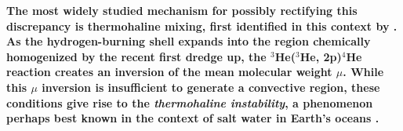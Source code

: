 



\textbf{The most widely studied mechanism for possibly rectifying this discrepancy is thermohaline mixing, first identified in this context by \citet{charbonnel_thermohaline_2007}.
As the hydrogen-burning shell expands into the region chemically homogenized by the recent first dredge up, the $^3$He($^3$He, 2p)$^4$He reaction creates an inversion of the mean molecular weight $\mu$. While this $\mu$ inversion is insufficient to generate a convective region, 
these conditions give rise to the 
\textit{thermohaline instability}, a phenomenon perhaps best known in the context of salt water in Earth's oceans \citep{CharbonnelZahn2007,CantielloLanger2010}.} 
%

